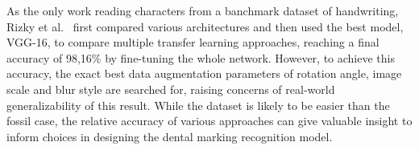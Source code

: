 \documentclass[english,twoside,openright]{UH_DS_MSc}
\begin{document}






As the only work reading characters from a banchmark dataset of handwriting, Rizky et al.~\cite{7rizkybasicCnnTransfer}
first compared various architectures and then used the best model, VGG-16, to compare multiple transfer learning 
approaches, reaching a final accuracy of 98,16\% by fine-tuning the whole network. However, to achieve this accuracy, the exact best data augmentation parameters of 
rotation angle, image scale and blur style are searched for, raising concerns of real-world generalizability of this result.
 While the dataset is likely to be easier than the fossil case, the relative accuracy of 
various approaches can give valuable insight to inform choices in designing the dental marking recognition model.
\end{document}
